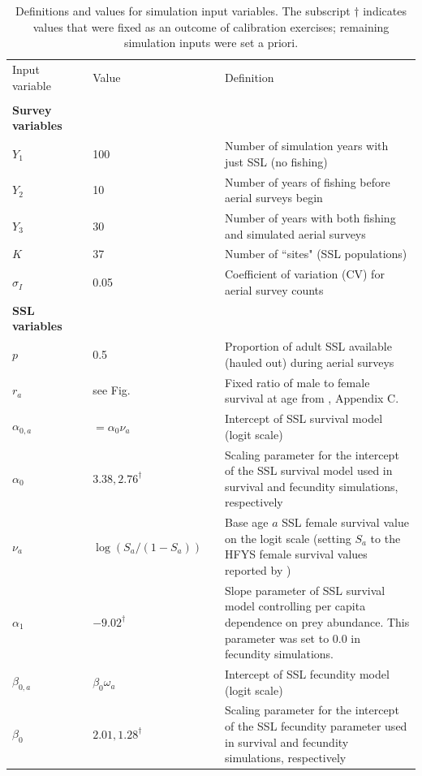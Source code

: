 \documentclass[nonumbib,leqno]{nrc1}
\begin{document}
\begin{table}
\caption{ \large Definitions and values for simulation input variables.  The subscript $\dag$
indicates values that were fixed as an outcome of calibration exercises; remaining simulation inputs were
set a priori.}
\label{tab:inputs}
\begin{tabular}{p{3cm}lll p{9cm}}
\\
\hline \hline
Input variable & & Value & & Definition\\
\cline{1-1} \cline{3-3} \cline{5-5}
\\
\multicolumn{1}{l}{\textbf{Survey variables}}  \\
$Y_1$ & & 100 & & Number of simulation years with just SSL (no fishing) \\
$Y_2$ & & 10 & & Number of years of fishing before aerial surveys begin \\
$Y_3$ & & 30 & & Number of years with both fishing and simulated aerial surveys \\
$K$ & & 37 & & Number of ``sites" (SSL populations)  \\
$\sigma_I$ & & 0.05 & & Coefficient of variation (CV) for aerial survey counts \\
\midrule
\multicolumn{1}{l}{\textbf{SSL variables}}  \\
$p$ & & 0.5 & & Proportion of adult SSL available (hauled out) during aerial surveys \\
$r_a$ & & see Fig. & & Fixed ratio
of male to female survival at age from \citet{HolmesEtAl2007}, Appendix C. \\
$\alpha_{0,a}$ & & $=\alpha_0 \nu_a $ & & Intercept of SSL survival model (logit scale) \\
$\alpha_0$ & & $3.38,2.76^\dag$ & & Scaling parameter for the intercept of the SSL survival model used in
                                    survival and fecundity simulations, respectively\\
$\nu_a $ & & $\log(S_a/(1-S_a))$ & & Base age $a$ SSL female survival value on the logit scale (setting $S_a$ to the HFYS female survival values reported by \citet{HolmesEtAl2007})  \\
$\alpha_1$ & & $-9.02^\dag$ & & Slope parameter of SSL survival model controlling per capita dependence on prey abundance.  This parameter was set to 0.0 in fecundity simulations. \\
$\beta_{0,a}$ & & $\beta_0 \omega_a$ & & Intercept of SSL fecundity model (logit scale) \\
$\beta_0$ & & $2.01,1.28^\dag$ & & Scaling parameter for the intercept of the SSL fecundity parameter used in survival and fecundity simulations, respectively \\

\end{tabular}
\end{table}
\end{document}
